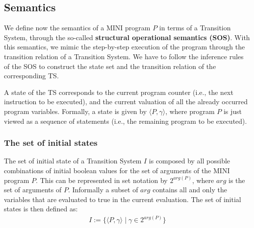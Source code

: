 \documentclass{article}
\begin{document}
\subsection{Semantics}
We define now the semantics of a MINI program $P$ in terms of a Transition System, through the so-called \textbf{structural operational semantics (SOS)}. With this semantics, we mimic the step-by-step execution of the program through the transition relation of a Transition System. We have to follow the inference rules of the SOS to construct the state set and the transition relation of the corresponding TS.

A state of the TS corresponds to the current program counter (i.e., the next instruction to be executed), and the current valuation of all the already occurred program variables.
Formally, a state is given by $\langle P, \gamma \rangle$, where program $P$ is just viewed as a sequence of statements (i.e., the remaining program to be executed). 

\subsubsection{The set of initial states}
The set of initial state of a Transition System $I$ is composed by all possible combinations of initial boolean values for the set of arguments of the MINI program $P$. This can be represented in set notation by $2^{arg(P)}$, where $arg$ is the set of arguments of $P$. Informally a subset of $arg$ contains all and only the variables that are evaluated to true in the current evaluation. The set of initial states is then defined as:
\begin{align*}
    I := \{ \langle P, \gamma \rangle \mid \gamma \in 2^{arg(P)} \}
\end{align*}
\end{document}
